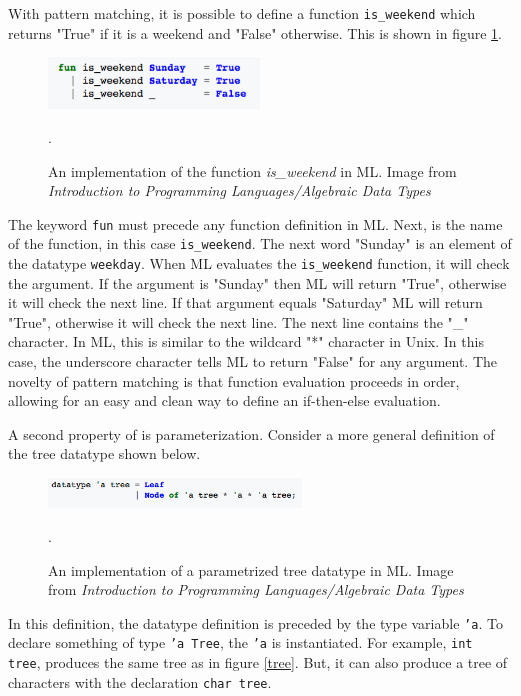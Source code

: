 \documentclass[../../main/main.tex]{subfiles}
\begin{document}
With pattern matching, it is possible to define a function \texttt{is_weekend} which returns "True" if it is a weekend and "False" otherwise.  This is shown in figure \ref{isweekend}.

\begin{figure}[h]
\centering
\includegraphics[width=0.5\textwidth]{../figures/isweekend}
\caption{\label{isweekend} An implementation of the function \textit{is_weekend} in ML.  Image from \textit{Introduction to Programming Languages/Algebraic Data Types} \cite{types} }.  
\end{figure}


The keyword \texttt{fun} must precede any function definition in ML. Next, is the name of the function, in this case \texttt{is_weekend}.  The next word "Sunday" is an element of the datatype \texttt{weekday}.  When ML evaluates the \texttt{is_weekend} function, it will check the argument.  If the argument is "Sunday" then ML will return "True", otherwise it will check the next line.  If that argument equals "Saturday" ML will return "True", otherwise it will check the next line.  The next line contains the "_" character.  In ML, this is similar to the wildcard "*" character in Unix.  In this case, the underscore character tells ML to return "False" for any argument.  The novelty of pattern matching is that function evaluation proceeds in order, allowing for an easy and clean way to define an if-then-else evaluation.

A second property of  is parameterization.  Consider a more general definition of the tree datatype shown below.

\begin{figure}[h]
\centering
\includegraphics[width=0.6\textwidth]{../figures/treeparam}
\caption{\label{treeparam} An implementation of a parametrized tree datatype in ML.  Image from \textit{Introduction to Programming Languages/Algebraic Data Types} \cite{types} }.  
\end{figure}

In this definition, the datatype definition is preceded by the type variable \texttt{'a}.  To declare something of type \texttt{'a Tree}, the \texttt{'a} is instantiated.  For example, \texttt{int tree}, produces the same tree as in figure \ref{tree}.  But, it can also produce a tree of characters with the declaration \texttt{char tree}.  
\end{document}
